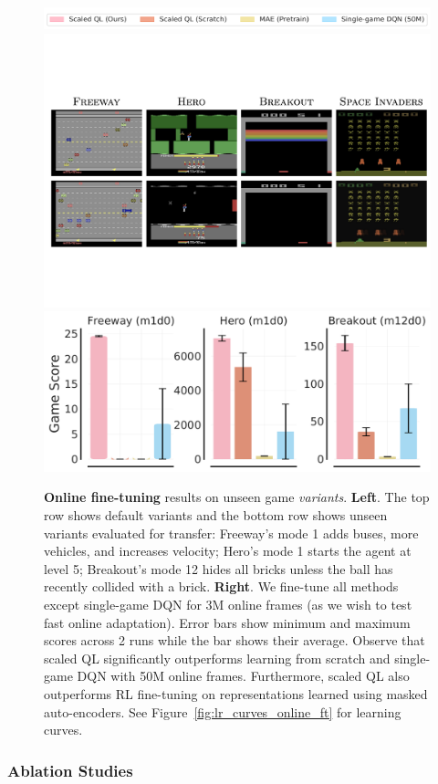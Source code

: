 \begin{figure}[t]
    \centering
        \includegraphics[width=0.9\linewidth]{chapters/scaled_ql/figures/legend_online_ft.pdf}
        \vspace{-0.1cm}
        \includegraphics[width=0.35\linewidth]{chapters/scaled_ql/figures/atari_modes_3games.pdf}
        \includegraphics[width=0.5\linewidth]{chapters/scaled_ql/figures/online_ft_3_games.pdf}
    \vspace{-0.1cm}
    \caption{\footnotesize{\textbf{Online fine-tuning} results on unseen game \emph{variants}. \textbf{Left}. The top row shows default variants and the bottom row shows unseen variants evaluated for transfer: Freeway’s mode 1 adds buses, more vehicles, and increases velocity; Hero’s mode 1 starts the agent at level 5; Breakout’s mode 12 hides all bricks unless the ball has recently collided with a brick. \textbf{Right}. We fine-tune all methods except single-game DQN for 3M online frames (as we wish to test fast online adaptation). Error bars show minimum and maximum scores across 2 runs while the bar shows their average. Observe that scaled QL significantly outperforms learning from scratch and single-game DQN with 50M online frames. Furthermore, scaled QL also outperforms RL fine-tuning on representations learned using masked auto-encoders. See Figure~\ref{fig:lr_curves_online_ft} for learning curves.}}
    \label{fig:online_ft}
    \vspace{-0.5cm}
\end{figure}


\vspace{-0.25cm}
\subsubsection{Ablation Studies}
\label{sec:ablation}
\vspace{-0.25cm}


